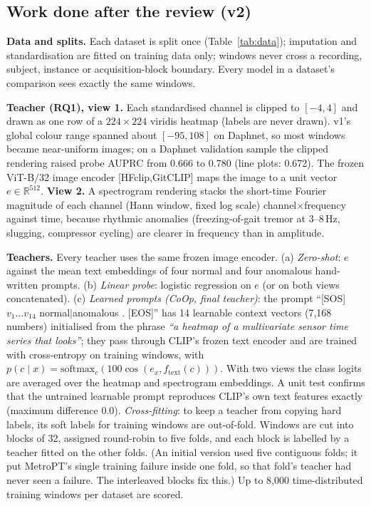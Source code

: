 \documentclass[twoside,english]{article}
\renewcommand{\cite}[1]{[#1]}
\begin{document}
\subsection{Work done after the review (v2)}
\textbf{Data and splits.} Each dataset is split once (Table~\ref{tab:data}); imputation and standardisation are fitted on training data only; windows never cross a recording, subject, instance or acquisition-block boundary. Every model in a dataset's comparison sees exactly the same windows.

\textbf{Teacher (RQ1), view 1.} Each standardised channel is clipped to $[-4,4]$ and drawn as one row of a $224\times224$ viridis heatmap (labels are never drawn). v1's global colour range spanned about $[-95,108]$ on Daphnet, so most windows became near-uniform images; on a Daphnet validation sample the clipped rendering raised probe AUPRC from 0.666 to 0.780 (line plots: 0.672). The frozen ViT-B/32 image encoder \cite{HFclip,GitCLIP} maps the image to a unit vector $e\in\mathbb{R}^{512}$. \textbf{View 2.} A spectrogram rendering stacks the short-time Fourier magnitude of each channel (Hann window, fixed log scale) channel$\times$frequency against time, because rhythmic anomalies (freezing-of-gait tremor at 3--8\,Hz, slugging, compressor cycling) are clearer in frequency than in amplitude.

\textbf{Teachers.} Every teacher uses the same frozen image encoder. (a) \emph{Zero-shot}: $e$ against the mean text embeddings of four normal and four anomalous hand-written prompts. (b) \emph{Linear probe}: logistic regression on $e$ (or on both views concatenated). (c) \emph{Learned prompts (CoOp, final teacher)}: the prompt ``[SOS] $v_1\dots v_{14}$ normal$\mid$anomalous . [EOS]'' has 14 learnable context vectors (7{,}168 numbers) initialised from the phrase \emph{``a heatmap of a multivariate sensor time series that looks''}; they pass through CLIP's frozen text encoder and are trained with cross-entropy on training windows, with $p(c\mid x)=\mathrm{softmax}_c(100\cos(e_x, f_{\mathrm{text}}(c)))$. With two views the class logits are averaged over the heatmap and spectrogram embeddings. A unit test confirms that the untrained learnable prompt reproduces CLIP's own text features exactly (maximum difference 0.0). \emph{Cross-fitting}: to keep a teacher from copying hard labels, its soft labels for training windows are out-of-fold. Windows are cut into blocks of 32, assigned round-robin to five folds, and each block is labelled by a teacher fitted on the other folds. (An initial version used five contiguous folds; it put MetroPT's single training failure inside one fold, so that fold's teacher had never seen a failure. The interleaved blocks fix this.) Up to 8{,}000 time-distributed training windows per dataset are scored.
\end{document}
